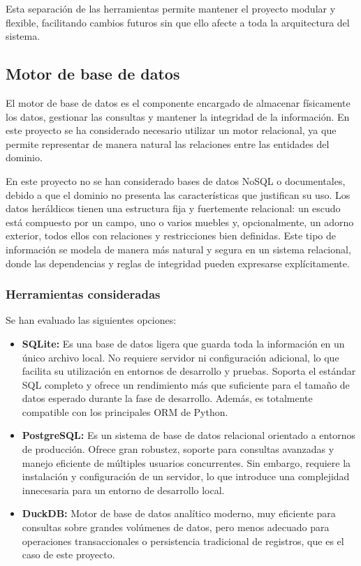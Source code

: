 Esta separación de las herramientas permite mantener el proyecto modular y flexible, facilitando cambios futuros sin
que ello afecte a toda la arquitectura del sistema.

\subsection{Motor de base de datos}
El motor de base de datos es el componente encargado de almacenar físicamente los datos, gestionar las consultas y
mantener la integridad de la información. En este proyecto se ha considerado necesario utilizar un motor relacional,
ya que permite representar de manera natural las relaciones entre las entidades del dominio.

En este proyecto no se han considerado bases de datos NoSQL o documentales, debido a que el dominio no presenta las 
características que justifican su uso. Los datos heráldicos tienen una estructura fija y fuertemente relacional: 
un escudo está compuesto por un campo, uno o varios muebles y, opcionalmente, un adorno exterior, todos ellos con 
relaciones y restricciones bien definidas. Este tipo de información se modela de manera más natural y segura en un 
sistema relacional, donde las dependencias y reglas de integridad pueden expresarse explícitamente.

\subsubsection{Herramientas consideradas}
Se han evaluado las siguientes opciones:

\begin{itemize}
    \item \textbf{SQLite:} Es una base de datos ligera que guarda toda la información en un único archivo local. 
    No requiere servidor ni configuración adicional, lo que facilita su utilización en entornos de desarrollo y pruebas.
    Soporta el estándar SQL completo y ofrece un rendimiento más que suficiente para el tamaño de datos esperado
    durante la fase de desarrollo. Además, es totalmente compatible con los principales ORM de Python.

    \item \textbf{PostgreSQL:} Es un sistema de base de datos relacional orientado a entornos de producción.
    Ofrece gran robustez, soporte para consultas avanzadas y manejo eficiente de múltiples usuarios concurrentes.
    Sin embargo, requiere la instalación y configuración de un servidor, lo que introduce una complejidad innecesaria
    para un entorno de desarrollo local.

    \item \textbf{DuckDB:} Motor de base de datos analítico moderno, muy eficiente para consultas sobre grandes volúmenes
    de datos, pero menos adecuado para operaciones transaccionales o persistencia tradicional de registros, que es
    el caso de este proyecto.
\end{itemize}

